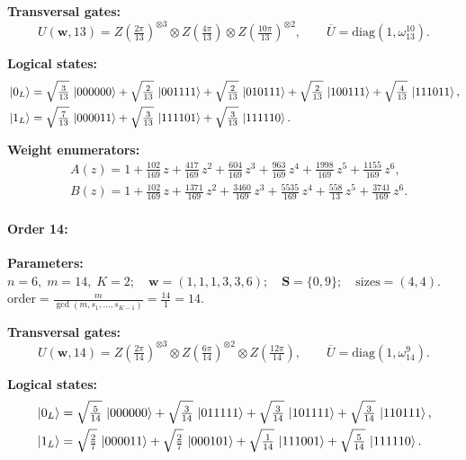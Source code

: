 \documentclass[pdflatex,sn-nature]{sn-jnl}%
\theoremstyle{thmstyleone}%
\theoremstyle{thmstyletwo}%
\theoremstyle{thmstylethree}%
\begin{document}
\begin{appendices}
\noindent\textbf{Transversal gates:}
\[
    U(\mathbf w,13)=Z \left(\tfrac{2\pi}{13}\right)^{\otimes3} \otimes Z \left(\tfrac{4\pi}{13}\right) \otimes Z \left(\tfrac{10\pi}{13}\right)^{\otimes2},\qquad
    \overline U=\mathrm{diag}(1,\omega_{13}^{10}).
\]

\noindent\textbf{Logical states:}
\begin{align*}
    &\ket{0_L} = \sqrt{\tfrac{3}{13}}\,\ket{000000} + \sqrt{\tfrac{2}{13}}\,\ket{001111} + \sqrt{\tfrac{2}{13}}\,\ket{010111} + \sqrt{\tfrac{2}{13}}\,\ket{100111} + \sqrt{\tfrac{4}{13}}\,\ket{111011}, \\
    &\ket{1_L} = \sqrt{\tfrac{7}{13}}\,\ket{000011} + \sqrt{\tfrac{3}{13}}\,\ket{111101} + \sqrt{\tfrac{3}{13}}\,\ket{111110}.
\end{align*}

\noindent\textbf{Weight enumerators:}
\begin{align*}
    &A(z) = 1 + \tfrac{102}{169}\,z + \tfrac{417}{169}\,z^{2} + \tfrac{604}{169}\,z^{3} + \tfrac{963}{169}\,z^{4} + \tfrac{1998}{169}\,z^{5} + \tfrac{1155}{169}\,z^{6}, \\
    &B(z) = 1 + \tfrac{102}{169}\,z + \tfrac{1371}{169}\,z^{2} + \tfrac{3460}{169}\,z^{3} + \tfrac{5535}{169}\,z^{4} + \tfrac{558}{13}\,z^{5} + \tfrac{3741}{169}\,z^{6}.
\end{align*}

\paragraph{\textbf{Order 14:}}
\noindent\textbf{Parameters:} $n=6,\; m=14,\; K=2;\quad \mathbf w=(1, 1, 1, 3, 3, 6);\quad \mathbf S=\{0, 9\};\quad \text{sizes}=\left(4, 4\right).$ $\displaystyle \text{order}=\frac{m}{\gcd(m,s_1,\dots,s_{K-1})}=\frac{14}{1}=14.$

\noindent\textbf{Transversal gates:}
\[
    U(\mathbf w,14)=Z \left(\tfrac{2\pi}{14}\right)^{\otimes3} \otimes Z \left(\tfrac{6\pi}{14}\right)^{\otimes2} \otimes Z \left(\tfrac{12\pi}{14}\right),\qquad
    \overline U=\mathrm{diag}(1,\omega_{14}^{9}).
\]

\noindent\textbf{Logical states:}
\begin{align*}
    &\ket{0_L} = \sqrt{\tfrac{5}{14}}\,\ket{000000} + \sqrt{\tfrac{3}{14}}\,\ket{011111} + \sqrt{\tfrac{3}{14}}\,\ket{101111} + \sqrt{\tfrac{3}{14}}\,\ket{110111}, \\
    &\ket{1_L} = \sqrt{\tfrac{2}{7}}\,\ket{000011} + \sqrt{\tfrac{2}{7}}\,\ket{000101} + \sqrt{\tfrac{1}{14}}\,\ket{111001} + \sqrt{\tfrac{5}{14}}\,\ket{111110}.
\end{align*}


\end{appendices}
\end{document}
